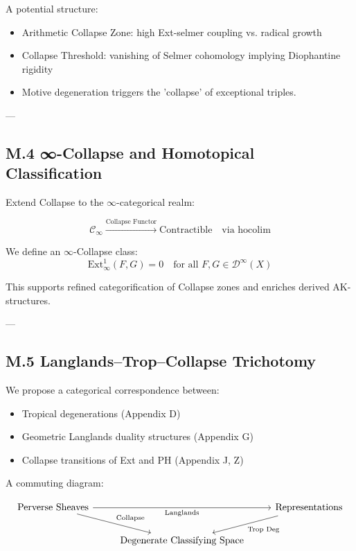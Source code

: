\documentclass[11pt]{article}
\begin{document}
\begin{axiom}
\begin{axiom}
{{A potential structure:

\begin{itemize}
  \item Arithmetic Collapse Zone: high Ext-selmer coupling vs. radical growth
  \item Collapse Threshold: vanishing of Selmer cohomology implying Diophantine rigidity
  \item Motive degeneration triggers the 'collapse' of exceptional triples.
\end{itemize}

---

\subsection*{M.4 ∞-Collapse and Homotopical Classification}

Extend Collapse to the $\infty$-categorical realm:

\[
\mathcal{C}_\infty \xrightarrow{\text{Collapse Functor}} \text{Contractible} \quad \text{via }\mathrm{hocolim}
\]

We define an $\infty$-Collapse class:
\[
\mathrm{Ext}^1_\infty(F,G) = 0 \quad \text{for all } F,G \in \mathcal{D}^\infty(X)
\]

This supports refined categorification of Collapse zones and enriches derived AK-structures.

---

\subsection*{M.5 Langlands–Trop–Collapse Trichotomy}

We propose a categorical correspondence between:

\begin{itemize}
  \item Tropical degenerations (Appendix D)
  \item Geometric Langlands duality structures (Appendix G)
  \item Collapse transitions of Ext and PH (Appendix J, Z)
\end{itemize}

A commuting diagram:

\[
\begin{tikzcd}
\text{Perverse Sheaves} \arrow[dr, "\text{Collapse}"] \arrow[rr, "\text{Langlands}"'] & & \text{Representations} \arrow[dl, "\text{Trop Deg}"] \\
& \text{Degenerate Classifying Space} &
\end{tikzcd}
\]

}}
\end{axiom}
\end{axiom}
\end{document}
